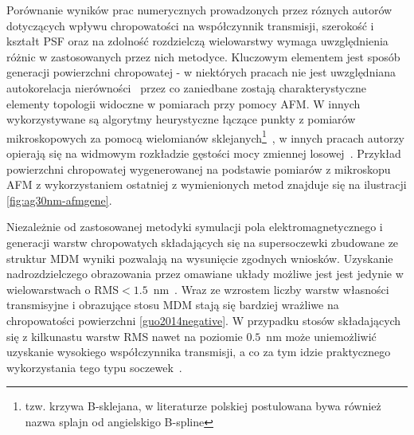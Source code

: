 Porównanie wyników prac numerycznych prowadzonych przez róznych autorów dotyczących wpływu chropowatości na współczynnik transmisji, szerokość i kształt PSF oraz na zdolność rozdzielczą wielowarstwy wymaga uwzględnienia różnic w zastosowanych przez nich metodyce. Kluczowym elementem jest sposób generacji powierzchni chropowatej - w niektórych pracach nie jest uwzględniana autokorelacja nierówności~\cite{guo2014negative} przez co zaniedbane zostają charakterystyczne elementy topologii widoczne w pomiarach przy pomocy AFM. W innych wykorzystywane są algorytmy heurystyczne łączące punkty z pomiarów mikroskopowych za pomocą wielomianów sklejanych\footnote{tzw. krzywa B-sklejana, w literaturze polskiej postulowana bywa również nazwa splajn od angielskigo B-spline}~\cite{ludwig2012impact}, w innych pracach autorzy opierają się na widmowym rozkładzie gęstości mocy zmiennej losowej~\cite{pastuszczak2013engineering}. Przykład powierzchni chropowatej wygenerowanej na podstawie pomiarów z mikroskopu AFM z wykorzystaniem ostatniej z wymienionych metod znajduje się na ilustracji \ref{fig:ag30nm-afmgene}.

Niezależnie od zastosowanej metodyki symulacji pola elektromagnetycznego i generacji warstw chropowatych składających się na supersoczewki zbudowane ze struktur MDM wyniki pozwalają na wysunięcie zgodnych wniosków. Uzyskanie nadrozdzielczego obrazowania przez omawiane układy  możliwe jest jest jedynie w wielowarstwach o RMS$<1.5$~nm~\citep{guo2014negative,stefaniuk2011effect,ludwig2012impact}. Wraz ze wzrostem liczby warstw własności transmisyjne i obrazujące stosu MDM stają się bardziej wrażliwe na chropowatości powierzchni \ref{guo2014negative}. W przypadku stosów składających się z kilkunastu warstw RMS nawet na poziomie $0.5$~nm może uniemożliwić uzyskanie wysokiego współczynnika transmisji, a co za tym idzie praktycznego wykorzystania tego typu soczewek~\cite{pastuszczak2013engineering}.








